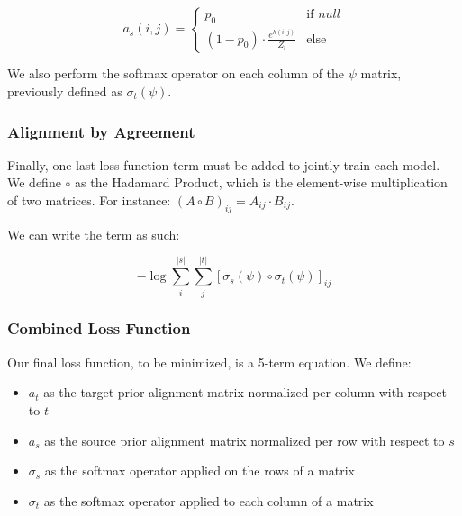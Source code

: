 \documentclass[twoside,twocolumn]{article}
\begin{document}
\begin{equation}
a_s (i, j) =
\begin{cases}
      p_0 & \text{if } null \\
     (1-p_0) \cdot \frac{e^{h(i,j)}}{Z_i} & \text{else}
   \end{cases}
\end{equation}

We also perform the softmax operator on each column of the $\psi$ matrix,
previously defined as $\sigma_t(\psi)$.


\subsubsection{Alignment by Agreement}

Finally, one last loss function term must be added to jointly train each model.
We define $\circ$ as the Hadamard Product, which is the element-wise
multiplication of two matrices. For instance:
$(A \circ B)_{ij} = A_{ij} \cdot B_{ij}$.

We can write the term as such:

\begin{equation}
  -\log \sum_i^{|s|} \sum_j^{|t|}
    \left[ \sigma_s(\psi) \circ \sigma_t(\psi) \right]_{ij}
\end{equation}



\subsubsection{Combined Loss Function}

Our final loss function, to be minimized, is a 5-term equation. We define:
\begin{itemize}[label={}]
  \item $a_t$ as the target prior alignment matrix normalized per column with respect to $t$\\ %
  \item $a_s$ as the source prior alignment matrix normalized per row with respect to $s$\\ %
  \item $\sigma_s$ as the softmax operator applied on the rows of a matrix\\
  \item $\sigma_t$ as the softmax operator applied to each column of a matrix
\end{itemize}
\end{document}
